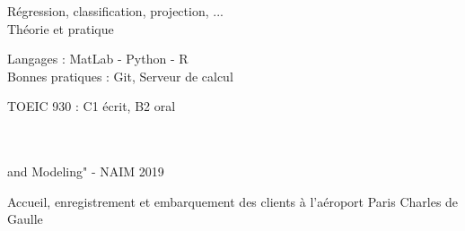 

Régression, classification, projection, ... \\
Théorie et pratique\\
\vspace{0.2cm}

Langages : MatLab - Python  - R\\
Bonnes pratiques : Git, Serveur de calcul

\vspace{0.2cm}

\vspace{0.1cm}
TOEIC 930 : C1 écrit, B2 oral

\vspace{0.25cm}

 \\
 \\ \hspace{0.5cm} and Modeling" - NAIM 2019

\vspace{0.25cm}

   Accueil, enregistrement et embarquement des clients à l'aéroport Paris Charles de Gaulle

